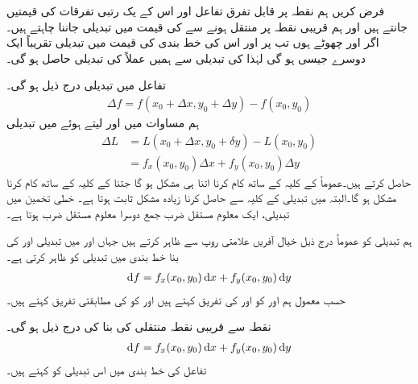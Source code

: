 فرض  کریں ہم   نقطہ    پر قابل تفرق تفاعل   اور اس کے یک رتبی تفرقات  کی قیمتیں جانتے ہیں اور ہم قریبی نقطہ   پر   منتقل ہونے سے  کی قیمت میں تبدیلی  جاننا چاہتے  ہیں۔ اگر  اور  چھوٹے ہوں تب پر   اور اس کی خط بندی کی  قیمت  میں تبدیلی تقریباً ایک دوسرے جیسی ہو گی لہٰذا  کی تبدیلی سے ہمیں عملاً   کی تبدیلی حاصل ہو گی۔

تفاعل   میں تبدیلی درج ذیل ہو گی۔
\begin{align*}
\Delta f=f(x_0+\Delta x,y_0+\Delta y)-f(x_0,y_0)
\end{align*}
ہم مساوات  میں  اور  لیتے ہوئے   میں تبدیلی
\begin{align*}
\Delta L&=L(x_0+\Delta x,y_0+\delta y)-L(x_0,y_0)\\
&=f_x(x_0,y_0)\Delta x+f_y(x_0,y_0)\Delta y
\end{align*}
حاصل کرتے ہیں۔عموماً  کے  کلیہ  کے ساتھ کام کرنا اتنا ہی مشکل ہو گا جتنا   کے کلیہ کے ساتھ کام کرنا مشکل ہو گا۔البتہ  میں تبدیلی  کے کلیہ سے حاصل کرنا زیادہ مشکل ثابت ہوتا ہے۔ خطی تخمین  میں تبدیلی،  ایک معلوم  مستقل ضرب  جمع دوسرا  معلوم  مستقل ضرب  ہوتا ہے۔  

ہم  تبدیلی  کو عموماً درج ذیل خیال آفریں  علامتی روپ    سے ظاہر کرتے ہیں جہاں اور  میں تبدیلی  اور  کی بنا     خط بندی میں   تبدیلی کو  ظاہر کرتی ہے۔ 
\begin{align*}
\dif f=f_x(x_0,y_0)\dif x+f_y(x_0,y_0)\dif y
\end{align*}
حسب معمول ہم  اور  کو  اور  کی  تفریق کہتے ہیں اور  کو  کی مطابقتی  تفریق کہتے ہیں۔

نقطہ   سے قریبی نقطہ  منتقلی  کی بنا  کی   درج ذیل ہو گی۔
\begin{align}\label{مساوات_کثیرالمتغیر_کل_تفریق}
\dif f=f_x(x_0,y_0)\dif x+f_y(x_0,y_0)\dif y
\end{align}
تفاعل  کی خط بندی میں اس تبدیلی کو کہتے ہیں۔

